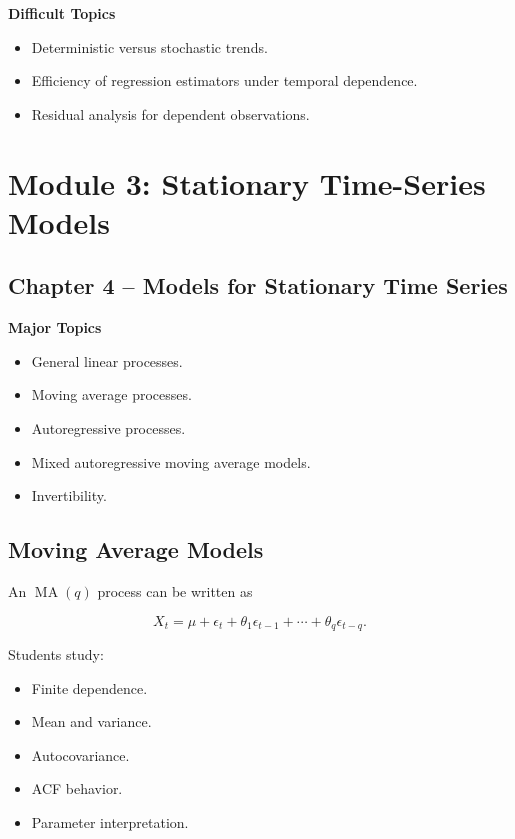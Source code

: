 \documentclass[11pt,a4paper]{article}
\newcommand{\MA}{\operatorname{MA}}
\begin{document}
\textbf{Difficult Topics}

\begin{itemize}
    \item Deterministic versus stochastic trends.
    \item Efficiency of regression estimators under temporal dependence.
    \item Residual analysis for dependent observations.
\end{itemize}

\section{Module 3: Stationary Time-Series Models}

\subsection{Chapter 4 -- Models for Stationary Time Series}

\textbf{Major Topics}

\begin{itemize}
    \item General linear processes.
    \item Moving average processes.
    \item Autoregressive processes.
    \item Mixed autoregressive moving average models.
    \item Invertibility.
\end{itemize}

\subsection{Moving Average Models}

An $\MA(q)$ process can be written as

\[
X_t
=
\mu+
\epsilon_t
+
\theta_1\epsilon_{t-1}
+\cdots+
\theta_q\epsilon_{t-q}.
\]

Students study:

\begin{itemize}
    \item Finite dependence.
    \item Mean and variance.
    \item Autocovariance.
    \item ACF behavior.
    \item Parameter interpretation.
\end{itemize}
\end{document}
